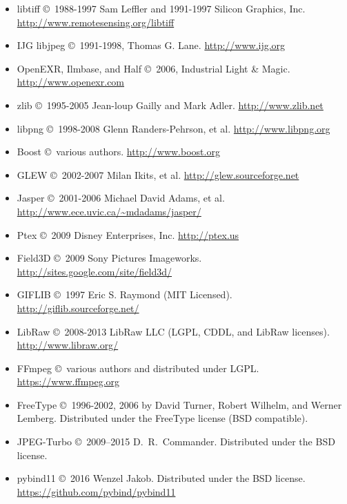 \begin{itemize}
\item {\cf libtiff} \copyright\ 1988-1997 Sam Leffler and 1991-1997 Silicon
Graphics, Inc. \\ \url{http://www.remotesensing.org/libtiff}
\item {\cf IJG libjpeg} \copyright\ 1991-1998, Thomas G. Lane.  \url{http://www.ijg.org}
\item OpenEXR, Ilmbase, and Half \copyright\ 2006, Industrial Light \& Magic.\\
\url{http://www.openexr.com}
\item {\cf zlib} \copyright\ 1995-2005 Jean-loup Gailly and Mark Adler. 
\url{http://www.zlib.net}
\item {\cf libpng} \copyright\ 1998-2008 Glenn Randers-Pehrson, et al.  
\url{http://www.libpng.org}
\item Boost \copyright\ various authors. \url{http://www.boost.org}
\item GLEW \copyright\ 2002-2007 Milan Ikits, et al. 
\url{http://glew.sourceforge.net}
\item Jasper \copyright\ 2001-2006 Michael David Adams, et al. \\
\url{http://www.ece.uvic.ca/~mdadams/jasper/}
\item Ptex \copyright\ 2009 Disney Enterprises, Inc.
\url{http://ptex.us}
\item Field3D \copyright\ 2009 Sony Pictures Imageworks.
\url{http://sites.google.com/site/field3d/}
\item {\cf GIFLIB} \copyright\ 1997 Eric S. Raymond (MIT Licensed).
\url{http://giflib.sourceforge.net/}
\item {\cf LibRaw} \copyright\ 2008-2013 LibRaw LLC (LGPL, CDDL, and LibRaw
    licenses). \\ \url{http://www.libraw.org/}
\item {\cf FFmpeg} \copyright\ various authors and distributed under LGPL.
   \url{https://www.ffmpeg.org}
\item {\cf FreeType} \copyright\ 1996-2002, 2006 by David Turner, Robert
    Wilhelm, and Werner Lemberg. Distributed under the FreeType license (BSD compatible).
\item {\cf JPEG-Turbo} \copyright\ 2009--2015 D.\ R.\ Commander. Distributed
    under the BSD license.
\item {\cf pybind11} \copyright\ 2016 Wenzel Jakob. Distributed under the
    BSD license. \url{https://github.com/pybind/pybind11}
\end{itemize}



\chapwidthend

